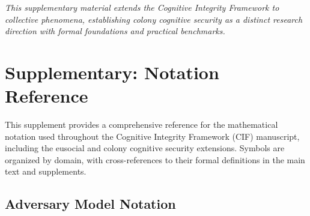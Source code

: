 \documentclass[
]{article}
\begin{document}
\emph{This supplementary material extends the Cognitive Integrity
Framework to collective phenomena, establishing colony cognitive
security as a distinct research direction with formal foundations and
practical benchmarks.}

\newpage

\newpage

\section{Supplementary: Notation
Reference}\label{sec:notation-reference}

This supplement provides a comprehensive reference for the mathematical
notation used throughout the Cognitive Integrity Framework (CIF)
manuscript, including the eusocial and colony cognitive security
extensions. Symbols are organized by domain, with cross-references to
their formal definitions in the main text and supplements.

\subsection{Adversary Model Notation}\label{adversary-model-notation}
\end{document}
